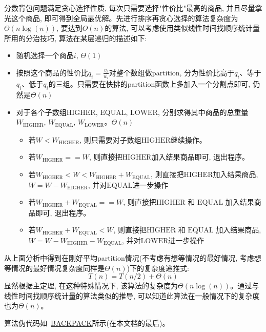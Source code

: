 \documentclass[paper=a4, fontsize=11pt]{scrartcl} %
\numberwithin{equation}{section} %
\numberwithin{figure}{section} %
\numberwithin{table}{section} %
\begin{document}
分数背包问题满足贪心选择性质, 每次只需要选择"性价比"最高的商品, 并且尽量拿光这个商品, 即可得到全局最优解。先进行排序再贪心选择的算法复杂度为$\Theta(n \log(n))$, 要达到$O(n)$的算法, 可以考虑使用类似线性时间找顺序统计量所用的分治技巧, 算法在某层递归的描述如下:
\begin{itemize}
\item 随机选择一个商品$i$, $\Theta(1)$
\item 按照这个商品的性价比$q_i = \frac{v_i}{w_i}$对整个数组做partition, 分为性价比高于$q_i$、等于$q_i$、低于$q_i$的三组。只需要在快排的partition函数上多加入一个分割点即可, 仍然是$\Theta(n)$
\item 对于各个子数组$\mbox{HIGHER}$, $\mbox{EQUAL}$, $\mbox{LOWER}$, 分别求得其中商品的总重量$W_{\mbox{HIGHER}}$, $W_{\mbox{EQUAL}}$, $W_{\mbox{LOWER}}$。$\Theta(n)$
  \begin{itemize}
  \item 若$W < W_{\mbox{HIGHER}}$, 则只需要对子数组$\mbox{HIGHER}$继续操作。
  \item 若$W_{\mbox{HIGHER}} == W $, 则直接把$\mbox{HIGHER}$加入结果商品即可, 退出程序。
  \item 若$W_{\mbox{HIGHER}} < W < W_{\mbox{HIGHER}} + W_{\mbox{EQUAL}}$, 则直接把$\mbox{HIGHER}$加入结果商品, $W = W - W_{\mbox{HIGHER}}$, 并对$\mbox{EQUAL}$进一步操作
  \item 若$W_{\mbox{HIGHER}} + W_{\mbox{EQUAL}} == W $, 则直接把$\mbox{HIGHER}$ 和 $\mbox{EQUAL}$ 加入结果商品即可, 退出程序。
  \item 若$W_{\mbox{HIGHER}} + W_{\mbox{EQUAL}} < W $, 则直接把$\mbox{HIGHER}$ 和 $\mbox{EQUAL}$ 加入结果商品, $W = W - W_{\mbox{HIGHER}} - W_{\mbox{EQUAL}}$, 并对$\mbox{LOWER}$进一步操作
  \end{itemize}
\end{itemize}

从上面分析中得到在刚好平均partition情况(不考虑有想等情况的最好情况, 考虑想等情况的最好情况复杂度同样是$\Theta(n)$)下的复杂度递推式:
\[
T(n) = T(n/2) + \Theta(n)
\]
显然根据主定理, 在这种特殊情况下, 该算法的复杂度为$\Theta(n \log(n))$。通过与线性时间找顺序统计量的算法类似的推导, 可以知道此算法在一般情况下的复杂度也为$\Theta(n)$。

算法伪代码如~\hyperref[algo:backpack]{BACKPACK}所示(在本文档的最后)。
\end{document}
